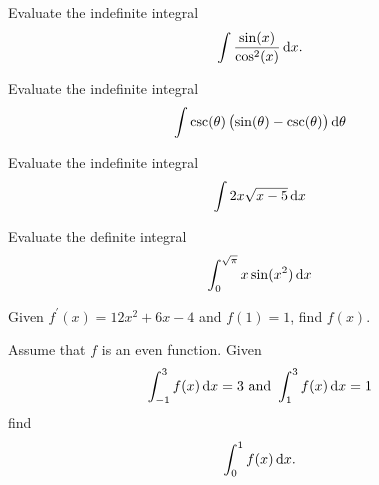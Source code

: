 \documentclass[12pt]{amsart}
\begin{document}
\newpage

\begin{thm}[10 Points]
  Evaluate the indefinite integral
  \[\int\frac{\sin(x)}{\cos^2(x)}\dif x.\]
\end{thm}

\vspace{3in}

\begin{thm}[10 Points]
  Evaluate the indefinite integral
  \[\int \csc(\theta)\left(\sin(\theta) - \csc(\theta)\right)\dif \theta\]
\end{thm}

\newpage

\begin{thm}[10 Points]
  Evaluate the indefinite integral
  \[\int 2x\sqrt{x - 5}\dif x\]
\end{thm}

\vspace{3in}

\begin{thm}[10 Points]
  Evaluate the definite integral
  \[\int_0^{\sqrt{\pi}} x\sin(x^2)\dif x\]
\end{thm}

\newpage

\begin{thm}[10 Points]
  Given \(f^\prime(x) = 12x^2 + 6x - 4\) and \(f(1) = 1\), find \(f(x)\).
\end{thm}

\vspace{3in}

\begin{thm}[10 Points]
  Assume that \(f\) is an even function.
  Given
  \[\int_{-1}^3 f(x)\dif x = 3\ \text{and}\ \int_1^{3} f(x)\dif x = 1\]
  find
  \[\int_0^{1} f(x)\dif x.\]
\end{thm}
\end{document}
